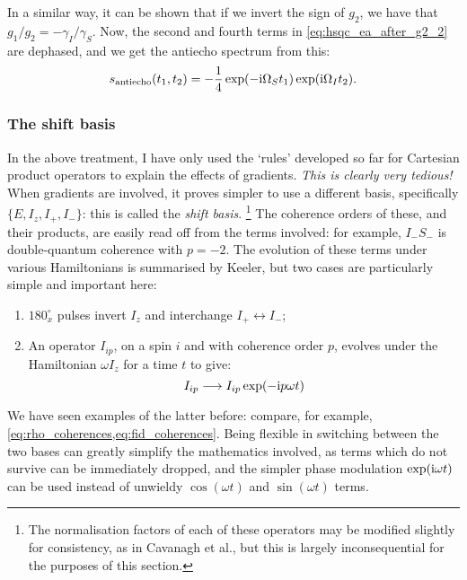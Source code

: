 In a similar way, it can be shown that if we invert the sign of $g_2$, we have that $g_1/g_2 = -\gamma_I/\gamma_S$.
Now, the second and fourth terms in \cref{eq:hsqc_ea_after_g2_2} are dephased, and we get the antiecho spectrum from this:
\begin{equation}
    \label{eq:hsqc_ea_antiecho_signal}
    s_\text{antiecho}(t_1, t_2) = -\frac{1}{4}\exp(-\mathrm{i} \Omega_S t_1)\exp(\mathrm{i} \Omega_I t_2).
\end{equation}


\subsubsection{The shift basis}

In the above treatment, I have only used the `rules' developed so far for Cartesian product operators to explain the effects of gradients.
\textit{This is clearly very tedious!}
When gradients are involved, it proves simpler to use a different basis, specifically $\{E, I_z, I_+, I_-\}$: this is called the \textit{shift basis}.%
\footnote{The normalisation factors of each of these operators may be modified slightly for consistency, as in Cavanagh et al.\autocite{Cavanagh2007}, but this is largely inconsequential for the purposes of this section.}
The coherence orders of these, and their products, are easily read off from the terms involved: for example, $I_-S_-$ is double-quantum coherence with $p = -2$.
The evolution of these terms under various Hamiltonians is summarised by Keeler\autocite{Keeler2010}, but two cases are particularly simple and important here:
\begin{enumerate}
    \item $180^\circ_x$ pulses invert $I_z$ and interchange $I_+ \leftrightarrow I_-$;
    \item An operator $I_{ip}$, on a spin $i$ and with coherence order $p$, evolves under the Hamiltonian $\omega I_z$ for a time $t$ to give:
        \begin{equation}
            \label{eq:shift_operator_evolution}
            I_{ip} \longrightarrow I_{ip} \exp(-\mathrm{i} p\omega t)
        \end{equation}
\end{enumerate}
We have seen examples of the latter before: compare, for example, \cref{eq:rho_coherences,eq:fid_coherences}.
Being flexible in switching between the two bases can greatly simplify the mathematics involved, as terms which do not survive can be immediately dropped, and the simpler phase modulation $\exp(\mathrm{i}\omega t)$ can be used instead of unwieldy $\cos(\omega t)$ and $\sin(\omega t)$ terms.

